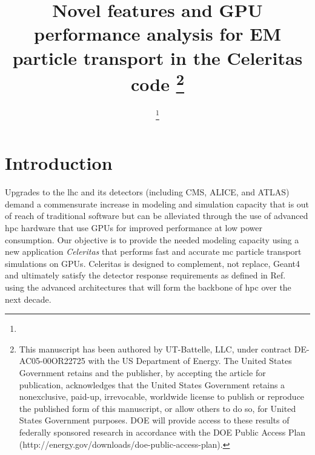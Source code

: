 \documentclass{webofc}
\begin{document}
\title{Novel features and GPU performance analysis for EM particle transport in
  the Celeritas code%
  \footnote{%
    This manuscript has been authored by
    UT-Battelle, LLC, under contract DE-AC05-00OR22725 with the US Department of
    Energy. The United States Government retains and the publisher, by accepting
    the article for publication, acknowledges that the United States Government
    retains a nonexclusive, paid-up, irrevocable, worldwide license to publish
    or reproduce the published form of this manuscript, or allow others to do
    so, for United States Government purposes. DOE will provide access to these
    results of federally sponsored research in accordance with the DOE Public
    Access Plan (http://energy.gov/downloads/doe-public-access-plan).%
  }%
}%
\author{%
  \fnsep\thanks{}
  \and
   
  \and
   
  \and
   
  \and
   
  \and
   
  \and
   
  \and
   
}%
%
%
\maketitle

\section{Introduction}
\label{sec:introduction}

Upgrades to the \ac{lhc} and its detectors (including CMS, ALICE, and ATLAS)
demand a commensurate increase in modeling and simulation capacity that is out
of reach of traditional software but can be alleviated through the use of
advanced \ac{hpc} hardware that use GPUs for improved performance at low power
consumption.  Our objective is to provide the needed modeling capacity using a
new application \emph{Celeritas} that performs fast and accurate \ac{mc}
particle transport simulations on GPUs. Celeritas is designed to complement, not
replace, Geant4 and ultimately satisfy the detector response requirements as
defined in Ref.~\cite{the_hep_software_foundation_roadmap_2019} using  the
advanced architectures that will form the backbone of \ac{hpc} over the next
decade.
\end{document}

